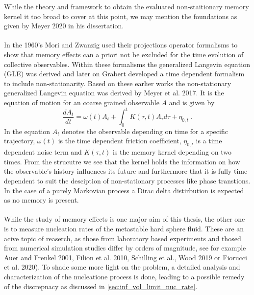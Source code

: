 {While the theory and framework to obtain the evaluated non-staitionary memory kernel it too broad to cover at this point, we may mention the foundations as given by Meyer 2020\cite{MeyerThesis} in his dissertation.\\\\
In the 1960's Mori and Zwanzig used their projections operator formalisms to show that memory effects can a priori not be excluded for the time evolution of collective observables. Within these formalisms the generalized Langevin equation (GLE) was derived and later on Grabert developed a time dependent formalism to include non-stationarity. Based on these earlier works the non-stationary generalized Langevin equation was derived by Meyer et al. 2017\cite{Meyer_nsGLE}. It is the equation of motion for an coarse grained observable $A$ and is given by
\begin{equation}
\label{eqn:EOM_A}
  \frac{d A_{t}}{dt} = \omega (t) A_{t} + \int_{0}^{t} K(\tau, t) A_{\tau} d\tau + \eta_{0,t} \; \text{.}
\end{equation}
In the equation $A_{t}$ denotes the observable depending on time for a specific trajectory, $\omega (t)$ is the time dependent friction coefficient, $\eta_{0,t}$ is a time dependent noise term and $K(\tau, t)$ is the memory kernel depending on two times. From the strucutre we see that the kernel holds the information on how the observable's history influences its future and furthermore that it is fully time dependent to suit the desciption of non-stationary processes like phase transtions. In the case of a purely Markovian process a Dirac delta distirbution is expected as no memory is present.\\\\
While the study of memory effects is one major aim of this thesis, the other one is to measure nucleation rates of the metastable hard sphere fluid. These are an acive topic of reaserch, as those from laboratory based experiments and thosed from numerical simulation studies differ by orders of magnitude, see for example Auer and Frenkel 2001\cite{Auer2001}, Filion et al. 2010\cite{Filion2010}, Schilling et al.\cite{Schilling2011}, Wood 2019\cite{Wood2019} or Fiorucci et al. 2020\cite{Fiorucci2020a}). To shade some more light on the problem, a detailed analysis and characterization of the nucleatione process is done, leading to a possible remedy of the discrepnacy as discussed in \autoref{sec:inf_vol_limit_nuc_rate}.
}



